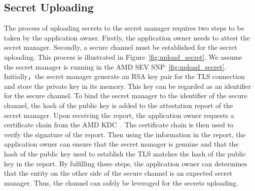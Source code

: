 \subsection{Secret Uploading}
\label{sec:design_Secret_Uploading}
The process of uploading secrets to the secret manager requires two steps to be taken by the application owner. Firstly, the application owner needs to attest the secret manager. Secondly, a secure channel must be established for the secret uploading. This process is illustrated in Figure~\ref{fig:upload_secret}. We assume the secret manager is running in the AMD SEV SNP~\ref{fig:upload_secret}. 
Initially，the secret manager generate an RSA key pair for the TLS connection and store the private key in its memory. This key can be regarded as an identifier for the secure channel. To bind the secret manager to the identifier of the secure channel, the hash of the public key is added to the attestation report of the secret manager. Upon receiving the report, 
the application owner requests a certificate chain from the AMD KDC~\cite*{snp_kdc}. The certificate chain is then used to verify the signature of the report. Then using the information in the report, the application owner can ensure that the secret manager is genuine and that the hash of the public key used to establish the TLS matches the hash of the public key 
in the report. By fulfilling these steps, the application owner can determines that the entity on the other side of the secure channel is an expected secret manager. Thus, the channel can safely be leveraged for the secrets uploading.


